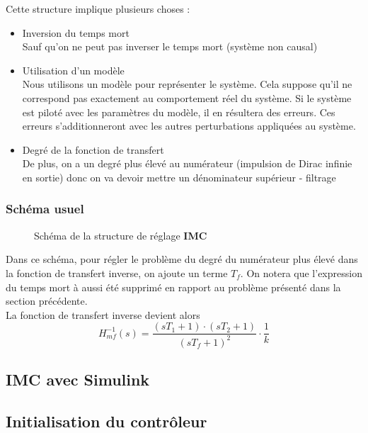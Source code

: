 Cette structure implique plusieurs choses :
\begin{itemize}
\item Inversion du temps mort\\
Sauf qu'on ne peut pas inverser le temps mort (système non causal)

\item Utilisation d'un modèle\\
Nous utilisons un modèle pour représenter le système. Cela suppose qu'il ne correspond pas exactement au comportement réel du système. Si le système est piloté avec les paramètres du modèle, il en résultera des erreurs. Ces erreurs s'additionneront avec les autres perturbations appliquées au système. 
 
\item Degré de la fonction de transfert\\
De plus, on a un degré plus élevé au numérateur (impulsion de Dirac infinie en sortie) donc on va devoir mettre un dénominateur supérieur - filtrage
\end{itemize}

\subsubsection{Schéma usuel}
\begin{figure}[H]

\caption{Schéma de la structure de réglage \textbf{IMC}}
\end{figure}

Dans ce schéma, pour régler le problème du degré du numérateur plus élevé dans la fonction de transfert inverse, on ajoute un terme $T_{f}$. On notera que l'expression du temps mort à aussi été supprimé en rapport au problème présenté dans la section précédente.\\

La fonction de transfert inverse devient alors 
\begin{equation}
H_{mf}^{-1}(s) = \frac{(sT_{1} + 1) \cdot (sT_{2} + 1)}{(sT_{f} + 1)^{2}} \cdot \frac{1}{k}
\end{equation}

\subsection{IMC avec Simulink}

\subsection{Initialisation du contrôleur}